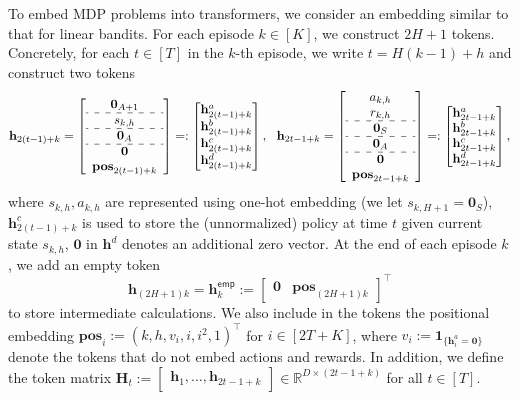\documentclass[10pt]{article}
\newcommand{\<}{\left\langle}
\renewcommand{\>}{\right\rangle}
\newcommand{\bzero}{{\mathbf 0}}
\newcommand{\bone}{{\mathbf 1}}
\newcommand{\R}{\mathbb{R}}
\newcommand{\posv}{{\mathbf{pos}}}
\newcommand{\parta}{{a}}
\newcommand{\partb}{{b}}
\newcommand{\partc}{{c}}
\newcommand{\partd}{{d}}
\newcommand{\state}{{s}}
\newcommand{\action}{{a}}
\newcommand{\reward}{{r}}
\newcommand{\totlen}{{T}}
\newcommand{\Numepi}{{K}}
\newcommand{\horizon}{{H}}
\renewcommand{\horizon}{{H}}
\newcommand{\Numst}{{S}}
\newcommand{\Numact}{{A}}
\newcommand{\oddeven}{{v}}
\newcommand{\emp}{{\mathsf{emp}}}
\def\bH{{\mathbf H}}
\def\bh{{\mathbf h}}
\begin{document}
To embed MDP problems into transformers, we consider an embedding similar to that for linear bandits. For each episode $k\in[\Numepi]$, we construct $2\horizon+1$ tokens. Concretely, for each $t\in[\totlen]$ in the $k$-th episode, we write  $t=\horizon(k-1)+h$  and construct two tokens
\[
\begin{aligned}
\bh_{2(t-1)+k}=
\left[
\begin{array}{cc}
     \bzero_{\Numact+1} \\
     \hdashline
     \state_{k,h}\\
      \hdashline
    \bzero_{\Numact}\\
    \hdashline
    \bzero\\
    \posv_{2(t-1)+k}
\end{array}\right]
=:
\begin{bmatrix}
     \bh_{2(t-1)+k}^{\parta} \\  \bh_{2(t-1)+k}^{\partb}\\  \bh_{2(t-1)+k}^{\partc}\\   \bh_{2(t-1)+k}^{\partd}\\
\end{bmatrix},~~
\bh_{2t-1+k}=
\left[
\begin{array}{cc}
     \action_{k,h} \\
      \reward_{k,h}\\
      \hdashline
      \bzero_{\Numst}\\
      \hdashline
      \bzero_{\Numact}\\
     \hdashline
      \bzero\\
      \posv_{2t-1+k}
\end{array}\right]=:
\begin{bmatrix}
    \bh_{2t-1+k}^{\parta} \\  \bh_{2t-1+k}^{\partb}\\   \bh_{2t-1+k}^{\partc}\\   \bh_{2t-1+k}^{\partd}
\end{bmatrix},
\end{aligned}
\]
where  $\state_{k,h},\action_{k,h}$ are represented using one-hot embedding (we let $\state_{k,\horizon+1}=\bzero_\Numst$), $\bh^\partc_{2(t-1)+k}$ is used to store the (unnormalized)  policy at time  $t$ given current state $\state_{k,h}$, $\bzero$ in $\bh^\partd$ denotes an additional zero vector. At the end of each episode $k$, we add an empty token
$$
\bh_{(2\horizon+1)k}=\bh^{\emp}_{k}:=\begin{bmatrix}
    \bzero &\posv_{(2\horizon+1)k}
\end{bmatrix}^\top
$$ to store intermediate calculations. We also include in the tokens  the positional embedding $\posv_i:=(k,h,v_i,i,i^2,1)^\top$ for $i\in[2\totlen+\Numepi]$, where $\oddeven_i:=\bone_{\{\bh_i^\parta=\bzero\}}$  denote the tokens that do not embed actions and rewards.    In addition, we define  the token matrix $\bH_t:=\begin{bmatrix}
    \bh_1,\ldots,\bh_{2t-1+k}
\end{bmatrix}\in\R^{D\times (2t-1+k)}$ for all $t\in[\totlen]$.
\end{document}

